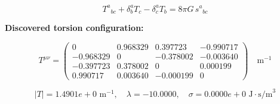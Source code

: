 
\begin{equation}
  T^a{}_{bc} + \delta^a_b T_c - \delta^a_c T_b = 8\pi G \, s^a{}_{bc}
\end{equation}

\textbf{Discovered torsion configuration:}

\begin{equation}
  T^{\mu\nu} = \begin{pmatrix}
    0 & 0.968329 & 0.397723 & -0.990717 \\
    -0.968329 & 0 & -0.378002 & -0.003640 \\
    -0.397723 & 0.378002 & 0 & 0.000199 \\
    0.990717 & 0.003640 & -0.000199 & 0
  \end{pmatrix} \quad \text{m}^{-1}
\end{equation}

\begin{equation}
  |T| = 1.4901e+0 \text{ m}^{-1}, \quad
  \lambda = -10.0000, \quad
  \sigma = 0.0000e+0 \text{ J}\cdot\text{s/m}^3
\end{equation}